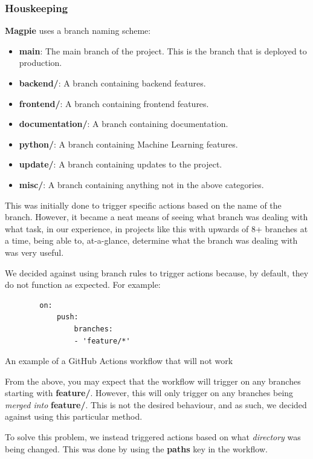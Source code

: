 \subsubsection{Houskeeping}
\textbf{Magpie} uses a branch naming scheme:
\begin{itemize}
    \item \textbf{main}: The main branch of the project. This is the branch that
        is deployed to production.
    \item \textbf{backend/}: A branch containing backend features.
    \item \textbf{frontend/}: A branch containing frontend features.
    \item \textbf{documentation/}: A branch containing documentation.
    \item \textbf{python/}: A branch containing Machine Learning features.
    \item \textbf{update/}: A branch containing updates to the project.
    \item \textbf{misc/}: A branch containing anything not in the above categories.
\end{itemize}
This was initially done to trigger specific actions based on the name of the
branch. However, it became a neat means of seeing what branch was dealing with
what task, in our experience, in projects like this with upwards of 8+ branches
at a time, being able to, at-a-glance, determine what the branch was dealing
with was very useful.

We decided against using branch rules to trigger actions because, by default,
they do not function as expected. For example:

\begin{listing}[htbp]
    \centering{}
    \begin{verbatim}
        on:
            push:
                branches:
                - 'feature/*'
    \end{verbatim}
    \caption{An example of a GitHub Actions workflow that will not work}
\end{listing}

From the above, you may expect that the workflow will trigger on any branches
starting with \textbf{feature/}. However, this will only trigger on any branches
being \textit{merged into} \textbf{feature/}. This is not the desired behaviour,
and as such, we decided against using this particular method.

To solve this problem, we instead triggered actions based on what \textit{directory} was
being changed. This was done by using the \textbf{paths} key in the workflow.

